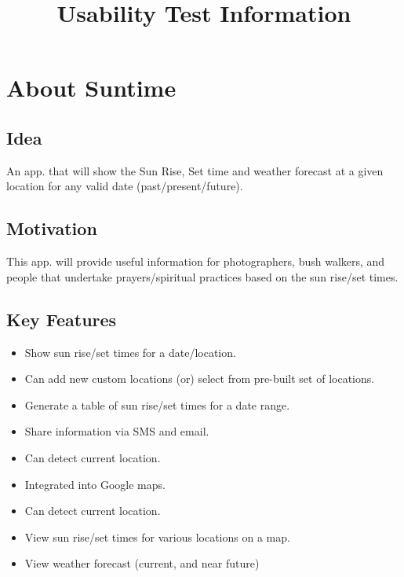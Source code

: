 \documentclass[a4paper, parskip=half]{scrartcl}
\title{Usability Test Information}
\date{}
\begin{document}

\section{About Suntime}
\subsection{Idea}
An app. that will show the Sun Rise, Set time and weather forecast at a given
location for any valid date (past/present/future).

\subsection{Motivation}
This app. will provide useful information for photographers, bush walkers, and
people that undertake prayers/spiritual practices based on the sun rise/set
times.

\subsection{Key Features}
\begin{itemize}
  \item{Show sun rise/set times for a date/location.}
  \item{Can add new custom locations (or) select from pre-built set of locations.}
  \item{Generate a table of sun rise/set times for a date range.}
  \item{Share information via SMS and email.}
  \item{Can detect current location.}
  \item{Integrated into Google maps.}
  \item{Can detect current location.}
  \item{View sun rise/set times for various locations on a map.}
  \item{View weather forecast (current, and near future)}
\end{itemize}
\end{document}
